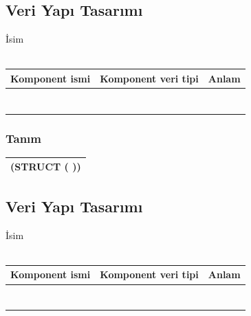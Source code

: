 \documentclass[12pt, a4paper]{article}
\newcommand\fillin[1][3cm]{\makebox[#1]{\dotfill}}
\begin{document}
\subsection*{Veri Yapı Tasarımı}
İsim  \fillin[5cm]\\
\vspace{0.5cm}\\
\begin{tabular}{| p{4cm} | p{4cm} | p{8cm} |  }
\hline			
Komponent ismi&Komponent veri tipi&Anlam\\
\hline
& & \\[10ex]
\hline  
& & \\[10ex]
\hline  
& & \\[10ex]
\hline  
& & \\[10ex]
\hline  
& & \\[10ex]
\hline  
& & \\[10ex]
\hline  
& & \\[10ex]
\hline  
\end{tabular}

\subsubsection*{Tanım}
\begin{tabular}{| p{17cm} |  }
\hline			
\vspace{0.5cm}
(STRUCT \fillin[3cm] (\fillin[10cm] ))\\[10ex]
\hline
\end{tabular}





\newpage
\subsection*{Veri Yapı Tasarımı}
İsim  \fillin[5cm]\\
\vspace{0.5cm}\\
\begin{tabular}{| p{4cm} | p{4cm} | p{8cm} |  }
\hline			
Komponent ismi&Komponent veri tipi&Anlam\\
\hline
& & \\[10ex]
\hline  
& & \\[10ex]
\hline  
& & \\[10ex]
\hline  
& & \\[10ex]
\hline  
& & \\[10ex]
\hline  
& & \\[10ex]
\hline  
& & \\[10ex]
\hline  
\end{tabular}
\end{document}
